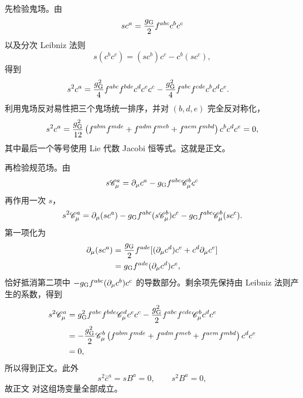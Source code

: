 \begin{derivation}

先检验鬼场。由
\begin{equation*}
 sc^a=\frac{g_{\rm G}}2f^{abc}c^bc^c
\end{equation*}
以及分次 Leibniz 法则
\begin{equation*}
 s(c^bc^c)=(sc^b)c^c-c^b(sc^c),
\end{equation*}
得到
\begin{align*}
 s^2c^a
 &=\frac{g_{\rm G}^2}{4}f^{abc}f^{bde}c^dc^ec^c
 -\frac{g_{\rm G}^2}{4}f^{abc}f^{cde}c^bc^dc^e.
\end{align*}
利用鬼场反对易性把三个鬼场统一排序，并对 $(b,d,e)$ 完全反对称化，
\begin{equation*}
 s^2c^a
 =\frac{g_{\rm G}^2}{12}
 \left(
 f^{abm}f^{mde}
 +f^{adm}f^{meb}
 +f^{aem}f^{mbd}
 \right)c^bc^dc^e=0,
\end{equation*}
其中最后一个等号使用 Lie 代数 Jacobi 恒等式。这就是正文。

再检验规范场。由
\begin{equation*}
 s\mathscr C_\mu^a
 =\partial_\mu c^a-g_{\rm G}f^{abc}\mathscr C_\mu^bc^c
\end{equation*}
再作用一次 $s$，
\begin{equation*}
 s^2\mathscr C_\mu^a
 =\partial_\mu(sc^a)
 -g_{\rm G}f^{abc}(s\mathscr C_\mu^b)c^c
 -g_{\rm G}f^{abc}\mathscr C_\mu^b(sc^c).
\end{equation*}
第一项化为
\begin{align*}
 \partial_\mu(sc^a)
 &=\frac{g_{\rm G}}2f^{ade}
 [ (\partial_\mu c^d)c^e+c^d\partial_\mu c^e]\\
 &=g_{\rm G}f^{ade}(\partial_\mu c^d)c^e,
\end{align*}
恰好抵消第二项中
$-g_{\rm G}f^{abc}(\partial_\mu c^b)c^c$ 的导数部分。剩余项先保持由 Leibniz 法则产生的系数，得到
\begin{align*}
 s^2\mathscr C_\mu^a
 &=g_{\rm G}^2f^{abc}f^{bde}\mathscr C_\mu^d c^e c^c
 -\frac{g_{\rm G}^2}{2}f^{abc}f^{cde}\mathscr C_\mu^b c^dc^e\\
 &=-\frac{g_{\rm G}^2}{2}\mathscr C_\mu^b
 \left(
 f^{abm}f^{mde}
 +f^{adm}f^{meb}
 +f^{aem}f^{mbd}
 \right)c^dc^e\\
 &=0,
\end{align*}
所以得到正文。此外
\begin{equation*}
 s^2\bar c^a=sB^a=0,
 \qquad
 s^2B^a=0,
\end{equation*}
故正文 对这组场变量全部成立。
\end{derivation}

